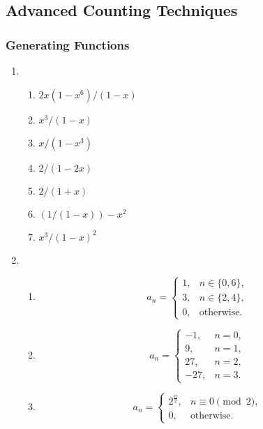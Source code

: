 \documentclass{../../cls/sig-alternate-05-2015}
\begin{document}
\subsection{Advanced Counting Techniques}
\subsubsection{Generating Functions}
\begin{enumerate}
	\item \begin{enumerate}
		\item $2x(1-x^6)/(1-x)$
		\item $x^3/(1-x)$
		\item $x/(1-x^3)$
		\item $2/(1-2x)$
		\item $2/(1+x)$
		\item $(1/(1-x))-x^2$
		\item $x^3/(1-x)^2$
	\end{enumerate}
	\item \begin{enumerate}
		\item \begin{equation}
			a_n = \begin{cases}
				1,&n \in \{0, 6\},\\
				3,&n \in \{2, 4\},\\
				0,&\text{otherwise.}
			\end{cases}
		\end{equation}
		
		\item \begin{equation}
			a_n = \begin{cases}
				-1,&n = 0,\\
				9,&n = 1,\\
				27,&n = 2,\\
				-27,&n = 3.
			\end{cases}
		\end{equation}
		
		\item \begin{equation}
			a_n = \begin{cases}
				2^{\frac{n}{2}}, & n \equiv 0 \pmod{2},\\
				0, & \text{otherwise}.
			\end{cases}
		\end{equation}
		

\end{enumerate}
\end{enumerate}
\end{document}

